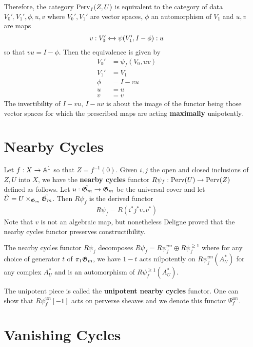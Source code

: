 \documentclass[12pt]{article}
\begin{document}
\hfill

Therefore, the category $\operatorname{Perv}_f(Z,U)$ is equivalent to the category of data
$V_0', V_1', \phi, u, v$ where $V_0', V_1'$ are vector spaces, 
$\phi$ an automorphism of $V_1$ and $u,v$ are maps \begin{align*}
    v:V_0' \xleftrightarrow{} \psi(V_1', I -\phi):u
\end{align*} so that $vu = I - \phi$. Then the equivalence is given by \begin{align*}
    V_0' &= \psi_f(V_0,uv) \\
    V_1' &= V_1 \\
    \phi &= I - vu\\
    u &= u\\
    v &= v
\end{align*}
The invertibility of $I - vu$, $I-uv$ is about the image
of the functor being those vector spaces for which the prescribed maps are
acting \textbf{maximally} unipotently.

\section{Nearby Cycles}
Let $f:X \to \mathbb{A}^1$ so that $Z = f^{-1}(0)$.
Given $i,j$ the open and closed inclusions of $Z,U$ into $X$, we have 
the \textbf{nearby cycles} functor $R\psi_f:\operatorname{Perv}(U) \to \operatorname{Perv}(Z)$ defined as follows. 
Let $u:\tilde {\mathfrak{G}_m} \to \mathfrak{G}_m$ be the universal cover and let $\tilde U = U \times_{\mathfrak{G}_m} \tilde {\mathfrak{G}_m}$.
Then $R\psi_f$ is the derived functor \begin{align*}
    R\psi_f = R(i^*j^*v_*v^*)
\end{align*} Note that $v$ is not an algebraic map, but
nonetheless Deligne proved that the nearby cycles functor preserves
constructibility.

\begin{lemma}
The nearby cycles functor $R\psi_f$ decomposes 
$R\psi_f = R\psi_f^{un} \oplus R\psi_f^{\geq 1}$ where for any choice of generator $t$
of $\pi_1\mathfrak{G}_m$, we have $1-t$ acts nilpotently on $R\psi_f^{un}(A^*_U)$
for any complex $A^*_U$ and is an automorphism of $R\psi_f^{\geq 1}(A^*_U)$.
\end{lemma}

The unipotent piece is called the \textbf{unipotent nearby cycles} functor.
One can show that $R\psi_f^{un}[-1]$ acts on perverse sheaves 
and we denote this functor $\Psi_f^{un}$.
 
\section{Vanishing Cycles}
\end{document}
